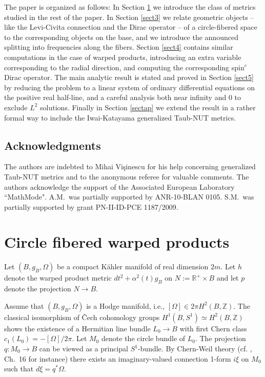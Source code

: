 \documentclass[12pt]{amsart}
\begin{document}
The paper is organized as follows: In Section \ref{cfwp} we introduce the 
class of metrics studied in the rest of the paper. In Section \ref{sect3}
we relate geometric objects -- like the Levi-Civita connection and
the Dirac operator -- of a circle-fibered space to the
corresponding objects on the base, and we  
introduce the announced splitting into frequencies along the fibers. 
Section \ref{sect4} contains similar computations in the case of
warped products, 
introducing an extra variable corresponding to the radial direction,
and computing the corresponding spin$^c$ Dirac operator. The main
analytic result 
is stated and proved in Section \ref{sect5} by reducing the problem to 
a linear system of ordinary differential equations on the positive
real half-line, and a careful analysis
both near infinity and $0$ to exclude $L^2$ solutions.
Finally in Section \ref{sectap} we extend the result in a rather formal way 
to include the Iwai-Katayama generalized Taub-NUT metrics.

\subsection*{Acknowledgments} The authors are indebted to Mihai 
Vi\c sinescu for his help concerning generalized Taub-NUT metrics and
to the anonymous referee for valuable comments. The authors
acknowledge the support of the 
  Associated European Laboratory ``MathMode". A.M.\ was partially
  supported by ANR-10-BLAN 0105. 
S.M.\ was partially supported by grant PN-II-ID-PCE 1187/2009.

\section{Circle fibered warped products}\label{cfwp}

Let $(B,g_B,{\Omega})$ be a compact K\"ahler manifold of real dimension $2m$. Let
$h$ denote the warped product metric $dt^2+{\alpha} ^2(t) g_B$ on
$N:={{\mathbb R}}^+\times B$ and let $p$ denote the projection $N\to B$.

Assume that $(B,g_B,{\Omega})$ is a Hodge manifold, i.e., $[{\Omega}]\in 2\pi H^2(B,{{\mathbb Z}})$. 
The classical isomorphism of \v Cech cohomology groups
$ H^1(B,S^1)\simeq H^2(B,{{\mathbb Z}})$ shows the existence of
a Hermitian line bundle $L_0\to B$ with first Chern class
$c_1(L_0)=-[{\Omega}]/2\pi$. Let $M_0$ denote the circle bundle of $L_0$.
The projection $q:M_0\to B$ can be
viewed as a principal $S^1$-bundle. By Chern-Weil 
theory (cf. \cite{m}, Ch.\ 16 for instance) there exists an
imaginary-valued connection 1-form $i\xi$ on $M_0$ such that $d\xi=q^*{\Omega}$.
\end{document}
